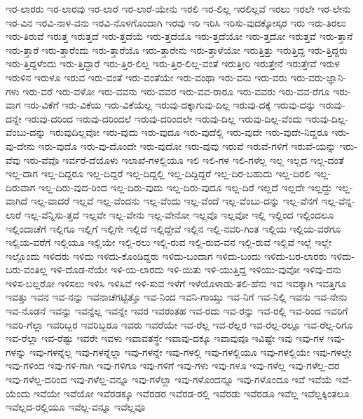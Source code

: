 {ಇರ-ಲಾರರು
ಇರ-ಲಾರವು
ಇರ-ಲಾರೆ
ಇರ-ಲಾರೆ-ಯೇನು
ಇರಲಿ
ಇರ-ಲಿಲ್ಲ
ಇರಲಿಲ್ಲವೆ
ಇರಲು
ಇರಲೇ
ಇರ-ಲೇನು
ಇರ-ವಿನ
ಇರವಿ-ನಾಳ-ವನು
ಇರವಿ-ನೊಳಗೊಂದಾಗಿ
ಇರವು
ಇರಿ
ಇರಿಸಿ
ಇರಿಸು-ವುದಕ್ಕೋಸ್ಕರ
ಇರು
ಇರು-ತಿರಲು
ಇರು-ತಿರುವೆ
ಇರುತ್ತ
ಇರುತ್ತದೆ
ಇರು-ತ್ತದೆಯೆ
ಇರು-ತ್ತದೆಯೊ
ಇರು-ತ್ತದೆಯೋ
ಇರು-ತ್ತದೋ
ಇರುತ್ತವೆ
ಇರು-ತ್ತಾನೆ
ಇರು-ತ್ತಾರೆ
ಇರು-ತ್ತಾರೆಂದು
ಇರು-ತ್ತಾರೆಯೊ
ಇರು-ತ್ತಾರೇನು
ಇರು-ತ್ತಾಳೆಯೋ
ಇರುತ್ತಿತ್ತು
ಇರುತ್ತಿದ್ದ
ಇರು-ತ್ತಿದ್ದರು
ಇರು-ತ್ತಿದ್ದಳೆಂದು
ಇರು-ತ್ತಿದ್ದಾರೆ
ಇರು-ತ್ತಿರ-ಲಿಲ್ಲ
ಇರು-ತ್ತಿರ-ಲಿಲ್ಲ-ವಂತೆ
ಇರುತ್ತೀರಿ
ಇರುತ್ತೇನೆ
ಇರುತ್ತೇವೆ
ಇರುಳ
ಇರುಳಿನ
ಇರುಳೂ
ಇರುವ
ಇರು-ವಂತೆ
ಇರು-ವಂತೆಯೇ
ಇರು-ವಂಥಾ
ಇರು-ವನು
ಇರು-ವರು
ಇರು-ವರು-ಜ್ಞಾನಿ-ಗಳು
ಇರು-ವರೆ
ಇರು-ವಳೋ
ಇರು-ವವನು
ಇರು-ವವರ
ಇರು-ವವ-ರಾರೂ
ಇರು-ವವರು
ಇರು-ವವ-ರೆಗೂ
ಇರು-ವಾಗ
ಇರು-ವಿಕೆಗೆ
ಇರು-ವಿಕೆಯ
ಇರು-ವಿಕೆಯೆಲ್ಲ
ಇರುವು-ದಕ್ಕಾಗುವು-ದಿಲ್ಲ
ಇರುವು-ದಕ್ಕೆ
ಇರುವು-ದನ್ನು
ಇರುವು-ದನ್ನೇ
ಇರುವು-ದರಿಂದ
ಇರುವು-ದರಿಂದಲೆ
ಇರುವು-ದರಿಂದಲೇ
ಇರುವು-ದಿಲ್ಲ
ಇರುವು-ದಿಲ್ಲ-ವೆಂದು
ಇರುವು-ದಿಲ್ಲ-ವೆಂಬು-ದನ್ನು
ಇರುವುದಿಲ್ಲವೋ
ಇರು-ವುದು
ಇರು-ವುದೂ
ಇರು-ವುದೆಲ್ಲಿ
ಇರು-ವುದೇ
ಇರು-ವುದೇ-ನಿದ್ದರೂ
ಇರು-ವು-ದೇನು
ಇರು-ವುದೊ
ಇರು-ವು-ದೊಂದೇ
ಇರು-ವುದೋ
ಇರು-ವುವು
ಇರುವೆ
ಇರುವೆ-ಗಳಿಗೆ
ಇರುವೆ-ಯನ್ನು
ಇರು-ವೆವು
ಇರು-ವೆವೊ
ಇರ್ವರೆ-ದೆಯೊಳು
ಇಲಾಖೆ-ಗಳಲ್ಲಿಯೂ
ಇಲಿ
ಇಲಿ-ಗಳ
ಇಲಿ-ಗಳೆಲ್ಲ
ಇಲ್ಲ
ಇಲ್ಲದ
ಇಲ್ಲ-ದಂತೆ
ಇಲ್ಲ-ದಾಗ
ಇಲ್ಲ-ದಿದ್ದರೂ
ಇಲ್ಲ-ದಿದ್ದರೆ
ಇಲ್ಲ-ದಿದ್ದಲ್ಲಿ
ಇಲ್ಲ-ದಿದ್ದಿದ್ದರೆ
ಇಲ್ಲ-ದಿರ-ಬಹುದು
ಇಲ್ಲ-ದಿರಲಿ
ಇಲ್ಲ-ದಿರುವಾಗ
ಇಲ್ಲ-ದಿರು-ವುದ-ರಿಂದ
ಇಲ್ಲ-ದಿರು-ವುದು
ಇಲ್ಲ-ದಿರು-ವುದೂ
ಇಲ್ಲ-ದಿರೆ
ಇಲ್ಲದೆ
ಇಲ್ಲದೇ
ಇಲ್ಲದ್ದು
ಇಲ್ಲ-ವಾಗಿದೆ
ಇಲ್ಲ-ವಾದರೆ
ಇಲ್ಲವೆ
ಇಲ್ಲ-ವೆಂದನು
ಇಲ್ಲ-ವೆಂದು
ಇಲ್ಲ-ವೆಂದೆ
ಇಲ್ಲ-ವೆಂಬು-ದನ್ನು
ಇಲ್ಲ-ವೆನಗೆ
ಇಲ್ಲ-ವೆನ್ನ-ಲಾರೆ
ಇಲ್ಲ-ವೆನ್ನಿಸು-ತ್ತದೆ
ಇಲ್ಲವೇ
ಇಲ್ಲ-ವೇನು
ಇಲ್ಲ-ವೇನೋ
ಇಲ್ಲವೊ
ಇಲ್ಲವೋ
ಇಲ್ಲಿ
ಇಲ್ಲಿಂದ
ಇಲ್ಲಿಂದಲೂ
ಇಲ್ಲಿಂದಾಚೆಗೆ
ಇಲ್ಲಿಗೂ
ಇಲ್ಲಿಗೆ
ಇಲ್ಲಿಗೇ
ಇಲ್ಲಿದೆ
ಇಲ್ಲಿದ್ದೇವೆ
ಇಲ್ಲಿನ
ಇಲ್ಲಿ-ನವರಿ-ಗಿಂತ
ಇಲ್ಲಿಯ
ಇಲ್ಲಿಯ-ವರೆಗೂ
ಇಲ್ಲಿಯ-ವರೆಗೆ
ಇಲ್ಲಿಯೂ
ಇಲ್ಲಿಯೇ
ಇಲ್ಲಿ-ರಲು
ಇಲ್ಲಿ-ರುವ
ಇಲ್ಲಿ-ರುವ-ವನ
ಇಲ್ಲಿ-ರುವೆ
ಇಲ್ಲಿವೆ
ಇಲ್ಲೆ
ಇಲ್ಲೇ
ಇಲ್ಲೊಂದು
ಇಳಿದರು
ಇಳಿದು
ಇಳಿದು-ಕೊಂಡಿದ್ದರು
ಇಳಿದು-ಬಂದಾಗ
ಇಳಿದು-ಬಂದು
ಇಳಿದು-ಬರ-ಲಾರರು
ಇಳಿದು-ಬರು-ವಂತಿಲ್ಲ
ಇಳಿ-ದೊಡ-ನೆಯೇ
ಇಳಿ-ಯ-ಲಾರದು
ಇಳಿ-ಯಿತು
ಇಳಿ-ಯುತ್ತಿದ್ದ
ಇಳಿಯು-ವುವೋ
ಇಳಿವು-ದನು
ಇಳಿಸ-ಬಲ್ಲರೋ
ಇಳಿಸಲು
ಇಳಿಸಿ
ಇಳಿಸಿವೆ
ಇಳಿ-ಸುವ
ಇಳೆಗೆ
ಇಳೆಯೊಳಾಡು-ತಲಿ-ಹೆನು
ಇವ
ಇವಕ್ಕಾಗಿ
ಇವತ್ತಿಗೂ
ಇವತ್ತು
ಇವನ
ಇವ-ನನ್ನು
ಇವನಾಚೆಗಟ್ಟಿತ್ತೊ
ಇವ-ನಿಂದ
ಇವನಿ-ಗಾಯ್ತು
ಇವ-ನಿಗೆ
ಇವ-ನಿಲ್ಲಿ
ಇವನು
ಇವ-ನೇನು
ಇವ-ನೊಡನೆ
ಇವನ್ನು
ಇವನ್ನೆಲ್ಲ
ಇವನ್ನೇ
ಇವರ
ಇವರಂತಹ
ಇವ-ರದು
ಇವ-ರನ್ನು
ಇವ-ರಲ್ಲಿ
ಇವ-ರಿಂದ
ಇವರಿಗೆ
ಇವರಿ-ಗೆಲ್ಲಾ
ಇವರಿಬ್ಬರ
ಇವರಿಬ್ಬರೂ
ಇವರು
ಇವರೆಯೇ
ಇವ-ರೆಲ್ಲ
ಇವ-ರೆಲ್ಲರ
ಇವ-ರೆಲ್ಲ-ರಲ್ಲೂ
ಇವ-ರೆಲ್ಲ-ರಿಗೂ
ಇವ-ರೆಲ್ಲಾ
ಇವ-ರೆಷ್ಟು
ಇವರೇ
ಇವಳು
ಇವಾವತಸ್ಥೇ
ಇವಾವು-ದಕ್ಕೂ
ಇವಾವುವೂ
ಇವಿಷ್ಟೇ
ಇವು
ಇವು-ಗಳ
ಇವು-ಗಳನ್ನು
ಇವು-ಗಳನ್ನೆಲ್ಲ
ಇವು-ಗಳನ್ನೆಲ್ಲಾ
ಇವು-ಗಳನ್ನೇ
ಇವು-ಗಳಲ್ಲಿ
ಇವು-ಗಳಲ್ಲಿಯೂ
ಇವು-ಗಳಲ್ಲಿಯೇ
ಇವು-ಗಳಲ್ಲೇ
ಇವು-ಗಳಿಂದ
ಇವು-ಗಳಿ-ಗಾಗಿ
ಇವು-ಗಳಿಗೂ
ಇವು-ಗಳಿಗೆ
ಇವು-ಗಳು
ಇವು-ಗಳೂ
ಇವು-ಗಳೆಲ್ಲ
ಇವು-ಗಳೆಲ್ಲ-ದರ
ಇವು-ಗಳೆಲ್ಲ-ದರಿಂದ
ಇವು-ಗಳೆಲ್ಲ-ವನ್ನೂ
ಇವು-ಗಳೆಲ್ಲಾ
ಇವು-ಗಳೊಂದನ್ನೂ
ಇವು-ಗಳೊಂದೂ
ಇವೆ
ಇವೆಯೆ
ಇವೆ-ಯೆಂದು
ಇವೆಯೇ
ಇವೆಯೋ
ಇವೆರಡಕ್ಕೂ
ಇವೆರಡರ
ಇವೆರಡ-ರಲ್ಲಿ
ಇವೆರಡು
ಇವೆರಡೂ
ಇವೆಲ್ಲ
ಇವೆಲ್ಲಕ್ಕಿಂತಲೂ
ಇವೆಲ್ಲದ-ರಲ್ಲಿಯೂ
ಇವೆಲ್ಲ-ವನ್ನೂ
ಇವೆಲ್ಲವೂ
}
